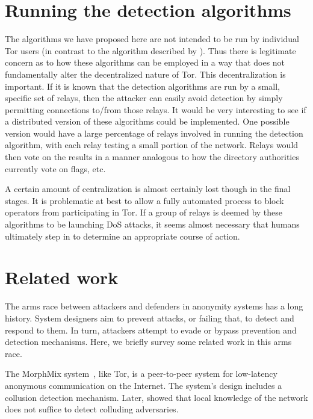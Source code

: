 \documentclass[]{lmcs}
\let\citeN\citet
\begin{document}
\section{Running the detection algorithms}
\label{sec:deployment}

The algorithms we have proposed here are not intended to be run
by individual Tor users (in contrast to the algorithm described by
\citeN{das-borisov:securing-tor-tunnels}).  Thus there is legitimate
concern as to how these algorithms can be employed in a way that does
not fundamentally alter the decentralized nature of Tor.  This
decentralization is important.  If it is known that the detection
algorithms are run by a small, specific set of relays, then the
attacker can easily avoid detection by simply permitting connections
to/from those relays.  It would be very interesting to see if a 
distributed version of these algorithms could be implemented.
One possible version would have a large percentage of relays
involved in running the detection algorithm, with each relay testing
a small portion of the network.
Relays would then vote on the results in a manner analogous to 
how the directory authorities currently vote on flags, etc.

A certain amount of centralization is almost certainly lost though
in the final stages.  It is problematic at best to allow a fully automated
process to block operators from participating in Tor.  If a group of
relays is deemed by these algorithms to be launching DoS attacks, it
seems almost necessary that humans ultimately step in to determine an
appropriate course of action.


\section{Related work}
\label{sec:related}

The arms race between attackers and defenders in anonymity systems has
a long history. System designers aim to prevent attacks, or failing
that, to detect and respond to them. In turn, attackers attempt to
evade or bypass prevention and detection mechanisms. Here, we briefly
survey some related work in this arms race.

The MorphMix system~\cite{morphmix:wpes2002}, like Tor, is a
peer-to-peer system for low-latency anonymous communication on the
Internet. The system's design includes a collusion detection
mechanism. 
Later, \citeN{morphmix:pet2006} showed
that local knowledge of the network does not suffice to detect
colluding adversaries. 
\end{document}
